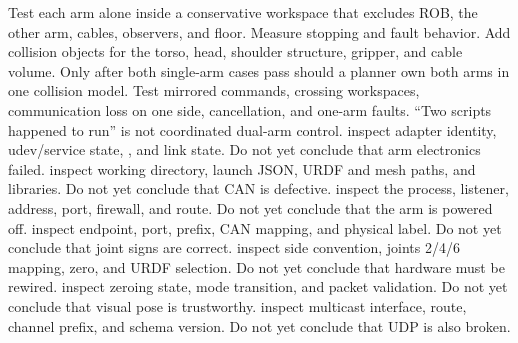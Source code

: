 {}
\markdownRendererSectionEnd \markdownRendererSectionBegin
{}\markdownRendererInterblockSeparator
{}Test each arm alone inside a conservative workspace that excludes ROB, the other arm, cables, observers, and floor. Measure stopping and fault behavior. Add collision objects for the torso, head, shoulder structure, gripper, and cable volume.\markdownRendererInterblockSeparator
{}
\markdownRendererSectionEnd \markdownRendererSectionBegin
{}\markdownRendererInterblockSeparator
{}Only after both single-arm cases pass should a planner own both arms in one collision model. Test mirrored commands, crossing workspaces, communication loss on one side, cancellation, and one-arm faults. “Two scripts happened to run” is not coordinated dual-arm control.\markdownRendererInterblockSeparator
{}
\markdownRendererSectionEnd 
\markdownRendererSectionEnd \markdownRendererSectionBegin
{}\markdownRendererInterblockSeparator
{}\markdownRendererUlBegin
\markdownRendererUlItem {} inspect adapter identity, udev/service state, , and link state. Do not yet conclude that arm electronics failed.\markdownRendererUlItemEnd 
\markdownRendererUlItem {} inspect working directory, launch JSON, URDF and mesh paths, and libraries. Do not yet conclude that CAN is defective.\markdownRendererUlItemEnd 
\markdownRendererUlItem {} inspect the process, listener, address, port, firewall, and route. Do not yet conclude that the arm is powered off.\markdownRendererUlItemEnd 
\markdownRendererUlItem {} inspect endpoint, port, prefix, CAN mapping, and physical label. Do not yet conclude that joint signs are correct.\markdownRendererUlItemEnd 
\markdownRendererUlItem {} inspect side convention, joints 2/4/6 mapping, zero, and URDF selection. Do not yet conclude that hardware must be rewired.\markdownRendererUlItemEnd 
\markdownRendererUlItem {} inspect zeroing state, mode transition, and packet validation. Do not yet conclude that visual pose is trustworthy.\markdownRendererUlItemEnd 
\markdownRendererUlItem {} inspect multicast interface, route, channel prefix, and schema version. Do not yet conclude that UDP is also broken.\markdownRendererUlItemEnd 
